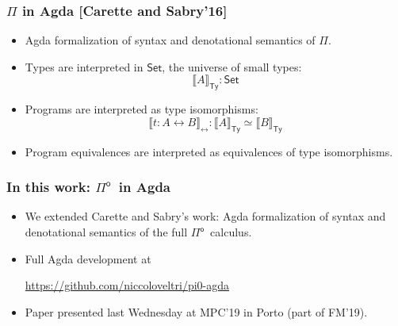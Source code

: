 \documentclass[12pt,t]{beamer}
\newcommand{\Pio}{\ensuremath{\mathsf{\Pi}^{\mathsf{o}}}}
\newcommand{\Set}{\mathsf{Set}}
\newcommand{\lr}{\longleftrightarrow}
\newcommand{\semTy}[1]{{\llbracket #1 \rrbracket}_\mathsf{Ty}}
\newcommand{\semTm}[1]{{\llbracket #1 \rrbracket}_{\lr}}
\begin{document}
\begin{frame}
  \frametitle{$\Pi$ in Agda [Carette and Sabry'16]}

  \begin{itemize}

  \item Agda formalization of syntax and
    denotational
    semantics of $\Pi$.
  \item Types are interpreted in $\Set$, the universe of small types:
    \[
    \semTy A : \Set
    \]
  \item Programs are interpreted as type isomorphisms:
    \[
    \semTm {t : A \lr B} : \semTy A \simeq \semTy B
    \]
  \item Program equivalences are interpreted as equivalences of
    type isomorphisms.
  \end{itemize}
  
  
\end{frame}

\begin{frame}
  
  \frametitle{In this work: \Pio\ in Agda}

  \begin{itemize}
  \item We extended Carette and Sabry's work: Agda formalization of
    syntax and denotational semantics of the full \Pio\ calculus.
    \vspace{\fill}
  \item  Full Agda development at 
    \begin{center}
      \url{https://github.com/niccoloveltri/pi0-agda}
    \end{center}    
  \item Paper presented last Wednesday at MPC'19 in Porto (part of
    FM'19).

    
  \end{itemize}
  
\end{frame}
\end{document}

